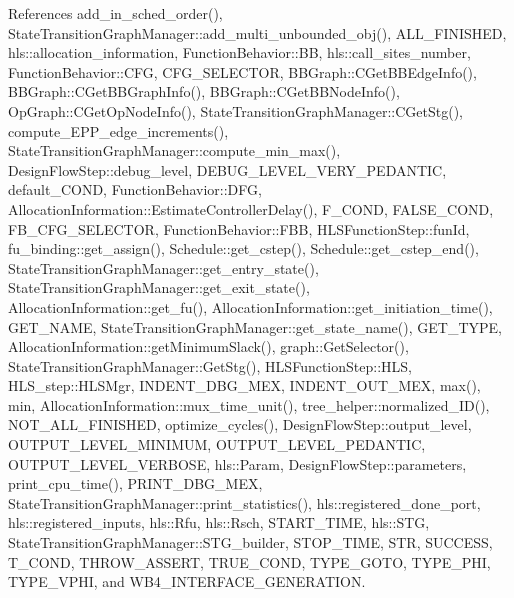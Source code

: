 References add\+\_\+in\+\_\+sched\+\_\+order(), State\+Transition\+Graph\+Manager\+::add\+\_\+multi\+\_\+unbounded\+\_\+obj(), A\+L\+L\+\_\+\+F\+I\+N\+I\+S\+H\+ED, hls\+::allocation\+\_\+information, Function\+Behavior\+::\+BB, hls\+::call\+\_\+sites\+\_\+number, Function\+Behavior\+::\+C\+FG, C\+F\+G\+\_\+\+S\+E\+L\+E\+C\+T\+OR, B\+B\+Graph\+::\+C\+Get\+B\+B\+Edge\+Info(), B\+B\+Graph\+::\+C\+Get\+B\+B\+Graph\+Info(), B\+B\+Graph\+::\+C\+Get\+B\+B\+Node\+Info(), Op\+Graph\+::\+C\+Get\+Op\+Node\+Info(), State\+Transition\+Graph\+Manager\+::\+C\+Get\+Stg(), compute\+\_\+\+E\+P\+P\+\_\+edge\+\_\+increments(), State\+Transition\+Graph\+Manager\+::compute\+\_\+min\+\_\+max(), Design\+Flow\+Step\+::debug\+\_\+level, D\+E\+B\+U\+G\+\_\+\+L\+E\+V\+E\+L\+\_\+\+V\+E\+R\+Y\+\_\+\+P\+E\+D\+A\+N\+T\+IC, default\+\_\+\+C\+O\+ND, Function\+Behavior\+::\+D\+FG, Allocation\+Information\+::\+Estimate\+Controller\+Delay(), F\+\_\+\+C\+O\+ND, F\+A\+L\+S\+E\+\_\+\+C\+O\+ND, F\+B\+\_\+\+C\+F\+G\+\_\+\+S\+E\+L\+E\+C\+T\+OR, Function\+Behavior\+::\+F\+BB, H\+L\+S\+Function\+Step\+::fun\+Id, fu\+\_\+binding\+::get\+\_\+assign(), Schedule\+::get\+\_\+cstep(), Schedule\+::get\+\_\+cstep\+\_\+end(), State\+Transition\+Graph\+Manager\+::get\+\_\+entry\+\_\+state(), State\+Transition\+Graph\+Manager\+::get\+\_\+exit\+\_\+state(), Allocation\+Information\+::get\+\_\+fu(), Allocation\+Information\+::get\+\_\+initiation\+\_\+time(), G\+E\+T\+\_\+\+N\+A\+ME, State\+Transition\+Graph\+Manager\+::get\+\_\+state\+\_\+name(), G\+E\+T\+\_\+\+T\+Y\+PE, Allocation\+Information\+::get\+Minimum\+Slack(), graph\+::\+Get\+Selector(), State\+Transition\+Graph\+Manager\+::\+Get\+Stg(), H\+L\+S\+Function\+Step\+::\+H\+LS, H\+L\+S\+\_\+step\+::\+H\+L\+S\+Mgr, I\+N\+D\+E\+N\+T\+\_\+\+D\+B\+G\+\_\+\+M\+EX, I\+N\+D\+E\+N\+T\+\_\+\+O\+U\+T\+\_\+\+M\+EX, max(), min, Allocation\+Information\+::mux\+\_\+time\+\_\+unit(), tree\+\_\+helper\+::normalized\+\_\+\+I\+D(), N\+O\+T\+\_\+\+A\+L\+L\+\_\+\+F\+I\+N\+I\+S\+H\+ED, optimize\+\_\+cycles(), Design\+Flow\+Step\+::output\+\_\+level, O\+U\+T\+P\+U\+T\+\_\+\+L\+E\+V\+E\+L\+\_\+\+M\+I\+N\+I\+M\+UM, O\+U\+T\+P\+U\+T\+\_\+\+L\+E\+V\+E\+L\+\_\+\+P\+E\+D\+A\+N\+T\+IC, O\+U\+T\+P\+U\+T\+\_\+\+L\+E\+V\+E\+L\+\_\+\+V\+E\+R\+B\+O\+SE, hls\+::\+Param, Design\+Flow\+Step\+::parameters, print\+\_\+cpu\+\_\+time(), P\+R\+I\+N\+T\+\_\+\+D\+B\+G\+\_\+\+M\+EX, State\+Transition\+Graph\+Manager\+::print\+\_\+statistics(), hls\+::registered\+\_\+done\+\_\+port, hls\+::registered\+\_\+inputs, hls\+::\+Rfu, hls\+::\+Rsch, S\+T\+A\+R\+T\+\_\+\+T\+I\+ME, hls\+::\+S\+TG, State\+Transition\+Graph\+Manager\+::\+S\+T\+G\+\_\+builder, S\+T\+O\+P\+\_\+\+T\+I\+ME, S\+TR, S\+U\+C\+C\+E\+SS, T\+\_\+\+C\+O\+ND, T\+H\+R\+O\+W\+\_\+\+A\+S\+S\+E\+RT, T\+R\+U\+E\+\_\+\+C\+O\+ND, T\+Y\+P\+E\+\_\+\+G\+O\+TO, T\+Y\+P\+E\+\_\+\+P\+HI, T\+Y\+P\+E\+\_\+\+V\+P\+HI, and W\+B4\+\_\+\+I\+N\+T\+E\+R\+F\+A\+C\+E\+\_\+\+G\+E\+N\+E\+R\+A\+T\+I\+ON.

